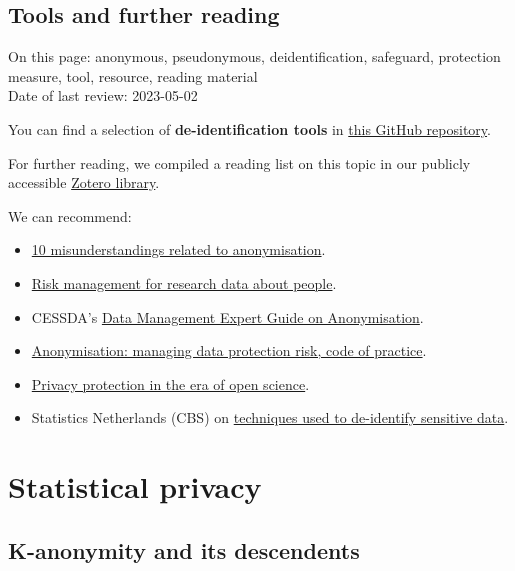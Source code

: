 \documentclass[
]{book}
\providecommand{\tightlist}{%
  \setlength{\itemsep}{0pt}\setlength{\parskip}{0pt}}
\begin{document}
\hypertarget{deidentification-resources}{%
\section{Tools and further reading}\label{deidentification-resources}}

On this page: anonymous, pseudonymous, deidentification, safeguard, protection
measure, tool, resource, reading material\\
Date of last review: 2023-05-02

You can find a selection of \textbf{de-identification tools} in
\href{https://github.com/UtrechtUniversity/privacy-engineering-tools/tree/main/deidentification}{this GitHub repository}.

For further reading, we compiled a reading list on this topic in our publicly
accessible \href{https://www.zotero.org/groups/2554340/data_privacy_uu/collections/6HS9MPBR}{Zotero library}.

We can recommend:

\begin{itemize}
\tightlist
\item
  \href{https://edps.europa.eu/system/files/2021-04/21-04-27_aepd-edps_anonymisation_en_5.pdf}{10 misunderstandings related to anonymisation}.
\item
  \href{https://doi.org/10.5281/zenodo.3584332}{Risk management for research data about people}.
\item
  CESSDA's \href{https://dmeg.cessda.eu/Data-Management-Expert-Guide/5.-Protect/Anonymisation}{Data Management Expert Guide on Anonymisation}.
\item
  \href{https://ico.org.uk/media/1061/anonymisation-code.pdf}{Anonymisation: managing data protection risk, code of practice}.
\item
  \href{https://doi.org/10.31234/osf.io/ybzu9}{Privacy protection in the era of open science}.
\item
  Statistics Netherlands (CBS) on
  \href{https://www.cbs.nl/en-gb/our-services/methods/statistical-methods/output/statistical-disclosure-control}{techniques used to de-identify sensitive data}.
\end{itemize}

\hypertarget{statistical-privacy}{%
\chapter{Statistical privacy}\label{statistical-privacy}}

\hypertarget{k-anonymity-and-its-descendents}{%
\section{K-anonymity and its descendents}\label{k-anonymity-and-its-descendents}}
\end{document}
